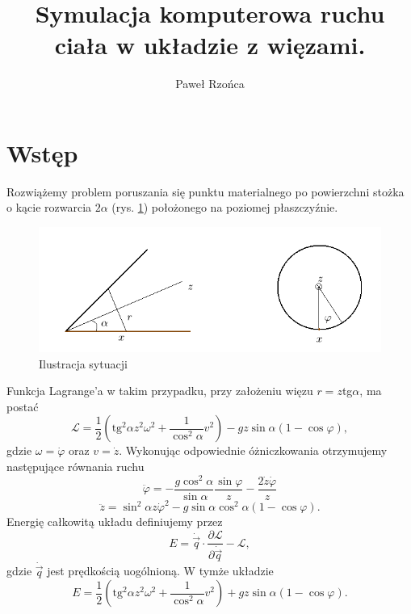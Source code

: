 \documentclass[11pt]{article}
\title{Symulacja komputerowa ruchu ciała w układzie z więzami.}
\author{Paweł Rzońca}
\begin{document}
\maketitle

\section*{Wstęp}
Rozwiążemy problem poruszania się punktu materialnego po powierzchni stożka o kącie 
rozwarcia $2\alpha$ (rys. \ref{r1}) położonego na poziomej płaszczyźnie. 
\begin{figure}[h!]
\begin{center}
\includegraphics[scale=0.8]{rys.png}
\caption{Ilustracja sytuacji} \label{r1}
\end{center}
\end{figure}


Funkcja Lagrange'a w takim przypadku, przy założeniu więzu $r=z$tg$\alpha$, ma postać
\begin{equation}
	\mathcal{L} = \dfrac{1}{2} \left( \mbox{tg}^2\alpha z^2 \omega^2 +
		\dfrac{1}{\cos^2\alpha}v^2 \right) - gz\sin\alpha (1-\cos\varphi),
\end{equation}
gdzie $\omega=\dot{\varphi}$ oraz $v=\dot{z}$. Wykonując odpowiednie óżniczkowania otrzymujemy 
następujące równania ruchu
\begin{equation}\label{1}
\ddot{\varphi} = -\dfrac{g\cos^2\alpha}{\sin\alpha} \dfrac{\sin\varphi}{z} -\dfrac{2\dot{z}\dot{\varphi}}{z}
\end{equation}\label{2}
\begin{equation}
\ddot{z} = \sin^2 \alpha z\dot{\varphi}^2 - g\sin\alpha \cos^2\alpha(1-\cos \varphi).
\end{equation}
Energię całkowitą układu definiujemy przez
\begin{equation}
E=\dot{\vec{q}} \cdot \dfrac{\partial \mathcal{L}}{\partial \dot{\vec{q}}} - \mathcal{L},
\end{equation}
gdzie $\dot{\vec{q}}$ jest prędkością uogólnioną. W tymże układzie 
\begin{equation}
	E = \dfrac{1}{2} \left( \mbox{tg}^2\alpha z^2 \omega^2 +
		\dfrac{1}{\cos^2\alpha}v^2 \right) + gz\sin\alpha (1-\cos\varphi).
\end{equation}
\end{document}
